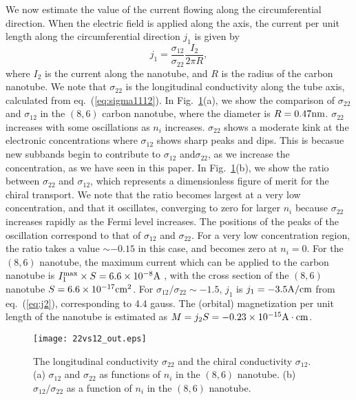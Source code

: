 \documentclass[journal=nalefd,manuscript=article,layout=twocolumn]{achemso}
\begin{document}
We now estimate the value of the current flowing 
along the circumferential direction. 
When the electric field is applied along the axis, the current per unit length along the circumferential direction 
$j_1$ is given by 
\begin{equation}
j_1=\frac{\sigma_{12}}{\sigma_{22}}\frac{I_2}{2\pi R}, 
\label{eq:j2}
\end{equation}
where $I_2$ is the current along the nanotube, and $R$ is the radius of 
the carbon nanotube. We note that $\sigma_{22}$ 
is the longitudinal conductivity along the tube axis, calculated from 
eq.~(\ref{eq:sigma1112}).
In Fig.\ \ref{fg:exp}(a), we show the comparison of $\sigma_{22}$ and $\sigma_{12}$ 
in the $(8,6)$ carbon nanotube, where the diameter is $R=0.47{\rm nm}$. 
$\sigma_{22}$ increases with some oscillations as $n_i$ increases. 
 $\sigma_{22}$ shows a moderate kink at the electronic concentrations 
where $\sigma_{12}$ shows sharp peaks and dips. 
This is becasue new subbands begin to contribute to $\sigma_{12}$ and$\sigma_{22}$, as we increase the concentration, 
as we have seen in this paper.
In Fig.\ \ref{fg:exp}(b), we show the ratio between $\sigma_{22}$ and $\sigma_{12}$, which 
represents a dimensionless figure of merit for the chiral transport.
We note that the ratio becomes largest at a very low concentration, and that it 
oscillates, converging to zero for larger $n_i$ because $\sigma_{22}$ 
increases rapidly as the Fermi level increases. 
The positions of the peaks of the oscillation correspond to that of $\sigma_{12}$ and $\sigma_{22}$. 
For a very low concentration region, the ratio takes a value $\sim-0.15$ in this case, and becomes zero at $n_i=0$. 
For the $(8,6)$ nanotube, the maximum current which can be applied to 
the carbon nanotube is $I_1^{\rm max}\times S=6.6\times 10^{-8}{\rm A} $ \cite{Dekker_1999}, 
with the cross section of the $(8,6)$ nanotube $S=6.6\times10^{-17}\rm cm^2$. 
For $\sigma_{12}/\sigma_{22}\sim -1.5$, $j_1$ is $j_1=-3.5{\rm A} /{\rm cm}$ from eq.\ (\ref{eq:j2}), corresponding to 4.4 gauss.
The (orbital) magnetization per unit length of the nanotube is estimated as 
$M=j_2S=-0.23\times 10^{-15}{\rm A}\cdot {\rm cm}$. 
\begin{figure}[htb]
\texttt{[image: 22vs12\_out.eps]}
\caption{The longitudinal conductivity $\sigma_{22}$ and the chiral conductivity $\sigma_{12}$. (a) $\sigma_{12}$ and $\sigma_{22}$ as functions of $n_i$ in the $(8,6)$ nanotube. 
(b) $\sigma_{12}/\sigma_{22}$ as a function of $n_i$ in the $(8,6)$ nanotube.  } 
\label{fg:exp}
\end{figure}
\end{document}
